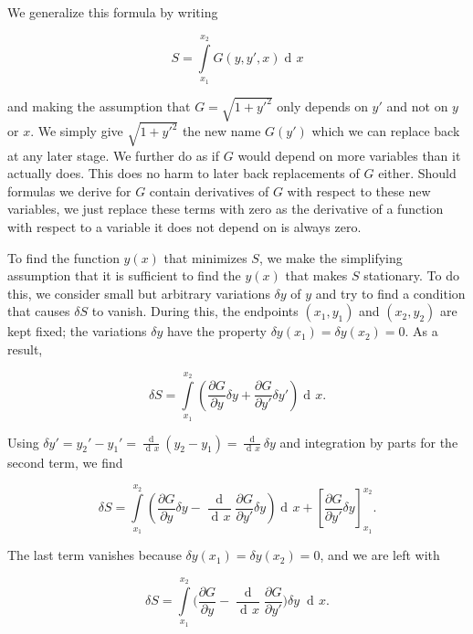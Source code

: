 \documentclass[prb,preprint]{revtex4-1}
\DeclareMathOperator{\dd}{d\!}
\DeclareMathOperator{\ddd}{\mathrm{d}}
\begin{document}
We generalize this formula by writing

\begin{equation}
S=\int\limits_{x_1}^{x_2} G(y,y',x) \dd x
\end{equation}



and making the assumption that $G = \sqrt{1 + y'^2}$ only depends on $y'$ and not on $y$ or $x$. We simply give $\sqrt{1+y'^2}$ the new name $G(y')$ which we can replace back at any later stage. We further do as if $G$ would depend on more variables than it actually does. This does no harm to later back replacements of $G$ either. Should formulas we derive for $G$ contain derivatives of $G$ with respect to these new variables, we just replace these terms with zero as the derivative of a function with respect to a variable it does not depend on is always zero. %

To find the function $y(x)$ that minimizes $S$, we make the simplifying assumption that it is sufficient to find the $y(x)$ that makes $S$ stationary. To do this, we consider small but arbitrary variations $\delta y$ of $y$ and try to find a condition that causes $\delta S$ to vanish. During this, the endpoints $(x_1,y_1)$ and $(x_2,y_2)$ are kept fixed; the variations $\delta y$ have the property $\delta y(x_1) = \delta y(x_2) = 0$. As a result,

\begin{equation}
\delta S = \int\limits_{x_1}^{x_2} \left(\frac{\partial G}{\partial y} \delta y
+ \frac{\partial G}{\partial y'} \delta y' \right) \dd x.
\end{equation}

Using $\delta y' = y_2' - y_1' = \frac{\ddd }{\dd x}(y_2 - y_1) = \frac{\ddd}{\dd x} \delta y$ and integration by parts for the second term, we find

\begin{equation}
\delta S = \int\limits_{x_1}^{x_2} \left( \frac{\partial G}{\partial y} \delta y
- \frac{\ddd}{\dd x}\frac{\partial G}{\partial y'} \delta y \right) \dd x
+ \left[\frac{\partial G}{\partial y'} \delta y \right]_{x_1}^{x_2}.
\end{equation}

The last term vanishes because $\delta y(x_1) = \delta y(x_2) = 0$, and we are left with


\begin{equation}
\delta S = \int\limits_{x_1}^{x_2} \bigg( \frac{\partial G}{\partial y}
- \frac{\ddd}{\dd x}\frac{\partial G}{\partial y'} \bigg) \delta y \; \dd x.
\end{equation}
\end{document}
